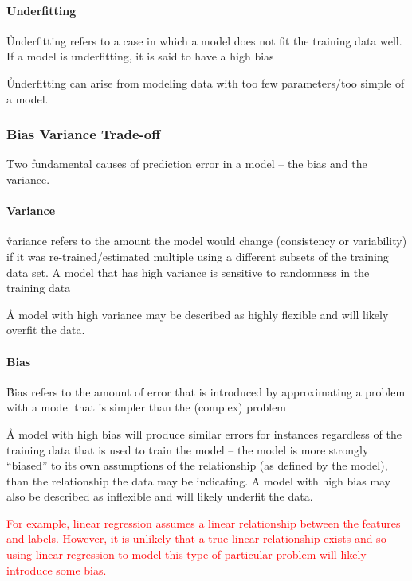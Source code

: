 \paragraph{Underfitting}

\r{Underfitting refers to a case in which a model does not fit the training data well. If a model is underfitting, it is said to have a high bias}

\r{Underfitting can arise from modeling data with too few parameters/too simple of a model.}



\subsubsection{Bias Variance Trade-off}

\r{Two fundamental causes of prediction error in a model -- the bias and the variance.}

\paragraph{Variance}
\r{variance refers to the amount the model would change (consistency or variability) if it was re-trained/estimated multiple using a different subsets of the training data set. A model that has high variance is sensitive to randomness in the training data}

\r{A model with high variance may be described as highly flexible and will likely overfit the data.}


\paragraph{Bias}
\r{Bias refers to the amount of error that is introduced by approximating a problem with a model that is simpler than the (complex) problem}

\r{A model with high bias will produce similar errors for instances regardless of the training data that is used to train the model -- the model is more strongly ``biased'' to its own assumptions of the relationship (as defined by the model), than the relationship the data may be indicating. A model with high bias may also be described as inflexible and will likely underfit the data.}


\textcolor{red}{For example, linear regression assumes a linear relationship between the features and labels. However, it is unlikely that a true linear relationship exists and so using linear regression to model this type of particular problem will likely introduce some bias.}

